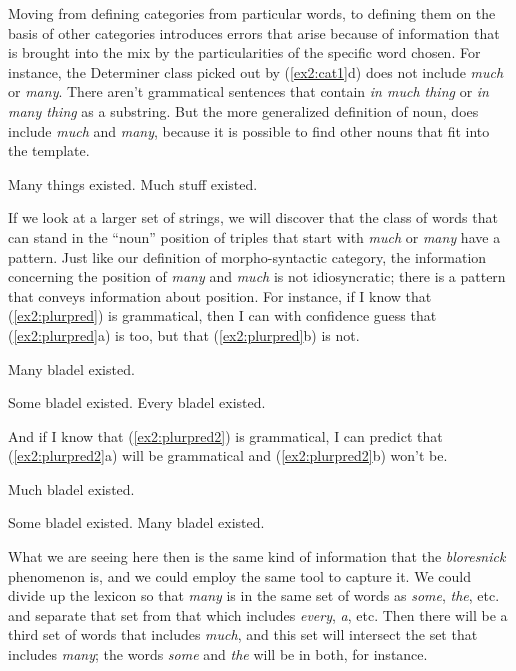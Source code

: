 Moving from defining categories from particular words, to defining them on the basis of other categories introduces errors that arise because of information that is brought into the mix by the particularities of the specific word chosen. For instance, the Determiner class picked out by (\ref{ex2:cat1}d) does not include \emph{much} or \emph{many}. There aren't grammatical sentences that contain \emph{in much thing} or \emph{in many thing} as a substring. But the more generalized definition of noun, does include \emph{much} and \emph{many}, because it is possible to find other nouns that fit into the template.
\begin{exe}
	\raggedright
	\ex \label{ex2:plr} 
	\begin{xlist}
		\ex Many things existed.
		\ex Much stuff existed.
	\end{xlist}
\end{exe}
If we look at a larger set of strings, we will discover that the class of words that can stand in the ``noun'' position of triples that start with \emph{much} or \emph{many} have a pattern. Just like our definition of morpho-syntactic category, the information concerning the position of \emph{many} and \emph{much} is not idiosyncratic; there is a pattern that conveys information about position. For instance, if I know that (\ref{ex2:plurpred}) is grammatical, then I can with confidence guess that (\ref{ex2:plurpred}a) is too, but that (\ref{ex2:plurpred}b) is not.
\begin{exe}
	\raggedright
	\ex \label{ex2:plurpred} 
	Many bladel existed.
	\begin{xlist}
		\ex Some bladel existed.
		\ex Every bladel existed.
	\end{xlist}
\end{exe}
And if I know that (\ref{ex2:plurpred2}) is grammatical, I can predict that (\ref{ex2:plurpred2}a) will be grammatical and (\ref{ex2:plurpred2}b) won't be.
\begin{exe}
	\raggedright
	\ex \label{ex2:plurpred2} 
	Much bladel existed.
	\begin{xlist}
		\ex Some bladel existed.
		\ex Many bladel existed.
	\end{xlist}
\end{exe}
What we are seeing here then is the same kind of information that the \emph{bloresnick} phenomenon is, and we could employ the same tool to capture it. We could divide up the lexicon so that \emph{many} is in the same set of words as \emph{some}, \emph{the}, etc. and separate that set from that which includes \emph{every}, \emph{a}, etc. Then there will be a third set of words that includes \emph{much}, and this set will intersect the set that includes \emph{many}; the words \emph{some} and \emph{the} will be in both, for instance. 

